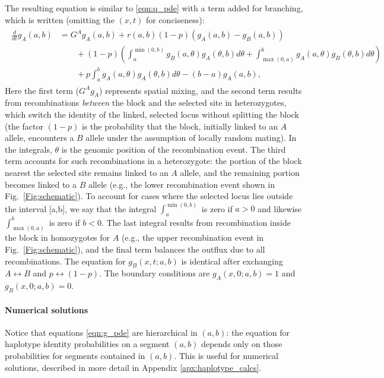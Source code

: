 \documentclass[11pt,letterpaper]{article}
\begin{document}
The resulting equation is similar to \eqref{eqn:q_pde} with a term added for branching,
which is written (omitting the $(x,t)$ for conciseness):
\begin{align}
    \begin{aligned} \label{eqn:g_pde}
        \frac{d}{dt} g_A(a,b) 
        &= G^A g_A(a,b) + r(a,b) (1-p) (g_A(a,b)-g_B(a,b))
            \\ {} & \qquad 
            + (1-p) \left( 
                \int_a^{\min(0,b)} g_B(a,\theta) g_A(\theta,b) d\theta
                + \int_{\max(0,a)}^b g_A(a,\theta) g_B(\theta,b) d\theta 
            \right)
            \\ {} & \qquad 
            + p \int_a^b {
                g_A(a,\theta) g_A(\theta,b) 
            } d\theta
            - (b-a) g_A(a,b)  ,
    \end{aligned} 
\end{align}
Here the first term ($G^A g_A$) represents spatial mixing,
and the second term results from recombinations \emph{between} the block and the selected site 
in heterozygotes, which switch the identity of the linked, selected locus without splitting the block
(the factor $(1-p)$ is the probability that the block, initially linked to an $A$ allele, encounters a $B$ allele
under the assumption of locally random mating).
In the integrals, $\theta$ is the genomic position of the recombination event.
The third term accounts for such recombinations in a heterozygote: 
the portion of the block nearest the selected site remains linked to an $A$ allele, 
and the remaining portion becomes linked to a $B$ allele 
(e.g., the lower recombination event shown in Fig.~\ref{Fig:schematic}).
To account for cases where the selected locus lies outside the interval [a,b],
we say that the integral $\int_a^{\min(0,b)}$ is zero if  $a>0$ 
and likewise $\int_{\max(0,a)}^b$ is zero if $b<0$.
The last integral results from recombination inside the block in homozygotes for $A$ 
(e.g., the upper recombination event in Fig.~\ref{Fig:schematic}),
and the final term balances the outflux due to all recombinations.
The equation for $g_B(x,t;a,b)$ is identical after exchanging $A \leftrightarrow B$ and
$p \leftrightarrow (1-p)$.
The boundary conditions are $g_A(x,0;a,b)=1$ and $g_B(x,0;a,b)=0$.

\paragraph{Numerical solutions}
Notice that equations \eqref{eqn:g_pde}
are hierarchical in $(a,b)$:
the equation for haplotype identity probabilities on a segment $(a,b)$ depends only on those probabilities for segments contained in $(a,b)$.
This is useful for numerical solutions, %
described in more detail in Appendix \ref{apx:haplotype_calcs}.
\end{document}
